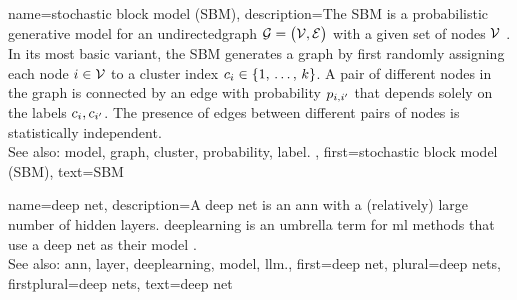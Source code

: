 {name={stochastic block model (SBM)},
	description={The SBM \cite{holland1983stochastic} is a 
		probabilistic generative \gls{model} for an \gls{undirectedgraph} $\mathcal{G} = \big( \mathcal{V}, \mathcal{E} \big)$ 
		with a given set of nodes $\mathcal{V}$ \cite{AbbeSBM2018}. In its most basic variant, 
		the SBM generates a \gls{graph} by first randomly assigning each node $i \in \mathcal{V}$ to 
		a \gls{cluster} index $c_{i} \in \{1, \,\ldots, \,k\}$. A pair of different nodes in the 
		\gls{graph} is \gls{connected} by an edge with \gls{probability} $p_{i,i'}$ that depends 
		solely on the \glspl{label} $c_{i}, c_{i'}$. 
		The presence of edges between different pairs of 
		nodes is statistically independent.
					\\ 
		See also: \gls{model}, \gls{graph}, \gls{cluster}, \gls{probability}, \gls{label}. },
	first={stochastic block model (SBM)},
	text={SBM} 
}

{name={deep net},
	description={A deep net is an \gls{ann} with a 
	    	(relatively) large number of hidden \glspl{layer}. \Gls{deeplearning} 
		is an umbrella term for \gls{ml} methods that use a deep 
		net as their \gls{model} \cite{Goodfellow-et-al-2016}.
				\\ 
		See also: \gls{ann}, \gls{layer}, \gls{deeplearning}, \gls{model}, \gls{llm}.},
	first={deep net},
	plural={deep nets},
	firstplural={deep nets},
	text={deep net} 
}

